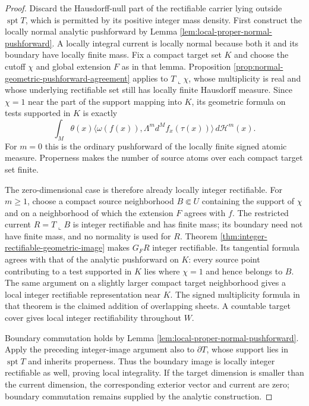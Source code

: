 \begin{proof}
Discard the Hausdorff-null part of the rectifiable carrier lying outside $\operatorname{spt}T$, which is permitted by its positive integer mass density. First construct the locally normal analytic pushforward by Lemma \ref{lem:local-proper-normal-pushforward}. A locally integral current is locally normal because both it and its boundary have locally finite mass. Fix a compact target set $K$ and choose the cutoff $\chi$ and global extension $F$ as in that lemma. Proposition \ref{prop:normal-geometric-pushforward-agreement} applies to $T\llcorner\chi$, whose multiplicity is real and whose underlying rectifiable set still has locally finite Hausdorff measure. Since $\chi=1$ near the part of the support mapping into $K$, its geometric formula on tests supported in $K$ is exactly
\[
 \int_M\theta(x)\langle\omega(f(x)),
       \Lambda^m d^Mf_x(\tau(x))\rangle\,d\mathcal H^m(x).
\]
For $m=0$ this is the ordinary pushforward of the locally finite signed atomic measure. Properness makes the number of source atoms over each compact target set finite.

The zero-dimensional case is therefore already locally integer rectifiable. For $m\geq1$, choose a compact source neighborhood $B\Subset U$ containing the support of $\chi$ and on a neighborhood of which the extension $F$ agrees with $f$. The restricted current $R=T\llcorner B$ is integer rectifiable and has finite mass; its boundary need not have finite mass, and no normality is used for $R$. Theorem \ref{thm:integer-rectifiable-geometric-image} makes $G_FR$ integer rectifiable. Its tangential formula agrees with that of the analytic pushforward on $K$: every source point contributing to a test supported in $K$ lies where $\chi=1$ and hence belongs to $B$. The same argument on a slightly larger compact target neighborhood gives a local integer rectifiable representation near $K$. The signed multiplicity formula in that theorem is the claimed addition of overlapping sheets. A countable target cover gives local integer rectifiability throughout $W$.

Boundary commutation holds by Lemma \ref{lem:local-proper-normal-pushforward}. Apply the preceding integer-image argument also to $\partial T$, whose support lies in $\operatorname{spt}T$ and inherits properness. Thus the boundary image is locally integer rectifiable as well, proving local integrality. If the target dimension is smaller than the current dimension, the corresponding exterior vector and current are zero; boundary commutation remains supplied by the analytic construction.


\end{proof}
